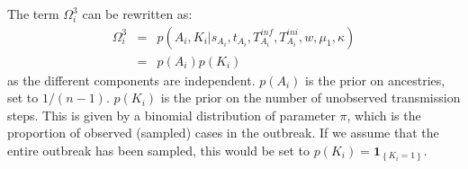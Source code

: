 \documentclass[10pt]{article}
\begin{document}
The term $\Omega_i^3$ can be rewritten as:
\begin{eqnarray}
\Omega_i^3 &=&  p(A_i, K_i| s_{A_i}, t_{A_i}, T_{A_i}^{inf}, T_{A_i}^{ini}, w, \mu_1, \kappa)\\
      & = &   p(A_i) p(K_i)
\end{eqnarray}
as the different components are independent.
$p(A_i)$ is the prior on ancestries, set to $1/(n-1)$.
$p(K_i)$ is the prior on the number of unobserved transmission steps.
This is given by a binomial distribution of parameter $\pi$, which is the proportion of observed (sampled) cases in the outbreak.
If we assume that the entire outbreak has been sampled, this would be set to $p(K_i) = \mathbf{1}_{\left\lbrace K_i=1\right\rbrace}$.
~\\
\end{document}
